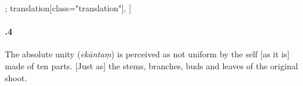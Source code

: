 \begin{alignment}[
  texts=edition[class="edition"];
  translation[class="translation"],
  ]
\begin{translation}
\begin{tlate}[21_4]
\paragraph{.4} The absolute unity (\textit{ekāntaṃ}) is perceived as not uniform by the self [as it is] made of ten parts. [Just as] the stems, branches, buds and leaves of the original shoot.
\flushpage 
\end{tlate}
\end{translation}
\end{alignment}
\pagebreak %
